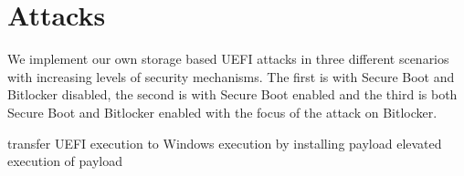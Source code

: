 
\chapter{Attacks}

We implement our own storage based UEFI attacks in three different scenarios with increasing levels of security mechanisms. The first is with Secure Boot and Bitlocker disabled, the second is with Secure Boot enabled and the third is both Secure Boot and Bitlocker enabled with the focus of the attack on Bitlocker.

transfer UEFI execution to Windows execution by installing payload
elevated execution of payload




